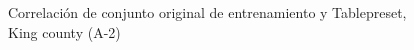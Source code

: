 \begin{figure}[H]
    \centering
    
    \caption{Correlación de conjunto original de entrenamiento y Tablepreset, King county (A-2)}
    \label{pairwise-king county-a-2-tablepreset}
\end{figure}